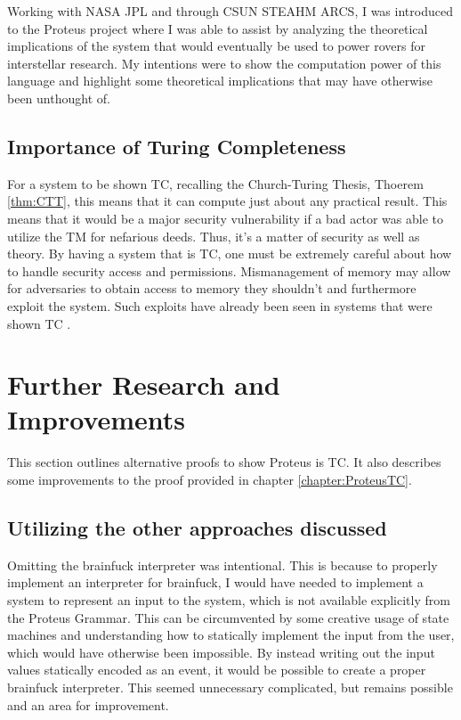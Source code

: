 Working with NASA JPL and through CSUN STEAHM ARCS, I was introduced to the Proteus project where I was able to assist by analyzing the theoretical implications of the system that would eventually be used to power rovers for interstellar research.
My intentions were to show the computation power of this language and highlight some theoretical implications that may have otherwise been unthought of.

\subsection{Importance of Turing Completeness}\label{subsec:ImportanceTC}

For a system to be shown TC, recalling the Church-Turing Thesis, Thoerem \ref{thm:CTT}, this means that it can compute just about any practical result.
This means that it would be a major security vulnerability if a bad actor was able to utilize the TM for nefarious deeds.
Thus, it's a matter of security as well as theory.
By having a system that is TC, one must be extremely careful about how to handle security access and permissions.
Mismanagement of memory may allow for adversaries to obtain access to memory they shouldn't and furthermore exploit the system.
Such exploits have already been seen in systems that were shown TC \cite{SecVuln}.

\section{Further Research and Improvements}\label{sec:FurtherResImprov}

This section outlines alternative proofs to show Proteus is TC.
It also describes some improvements to the proof provided in chapter \ref{chapter:ProteusTC}.

\subsection{Utilizing the other approaches discussed}

Omitting the brainfuck interpreter was intentional.
This is because to properly implement an interpreter for brainfuck, I would have needed to implement a system to represent an input to the system, which is not available explicitly from the Proteus Grammar.
This can be circumvented by some creative usage of state machines and understanding how to statically implement the input from the user, which would have otherwise been impossible.
By instead writing out the input values statically encoded as an event, it would be possible to create a proper brainfuck interpreter.
This seemed unnecessary complicated, but remains possible and an area for improvement.

